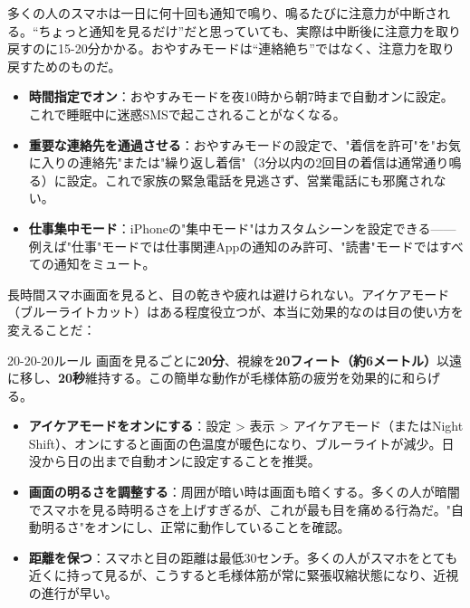 
多くの人のスマホは一日に何十回も通知で鳴り、鳴るたびに注意力が中断される。“ちょっと通知を見るだけ”だと思っていても、実際は中断後に注意力を取り戻すのに15-20分かかる。おやすみモードは“連絡絶ち”ではなく、注意力を取り戻すためのものだ。

\begin{itemize}
  \item \textbf{時間指定でオン}：おやすみモードを夜10時から朝7時まで自動オンに設定。これで睡眠中に迷惑SMSで起こされることがなくなる。
  \item \textbf{重要な連絡先を通過させる}：おやすみモードの設定で、"着信を許可"を"お気に入りの連絡先"または"繰り返し着信"（3分以内の2回目の着信は通常通り鳴る）に設定。これで家族の緊急電話を見逃さず、営業電話にも邪魔されない。
  \item \textbf{仕事集中モード}：iPhoneの"集中モード"はカスタムシーンを設定できる——例えば"仕事"モードでは仕事関連Appの通知のみ許可、"読書"モードではすべての通知をミュート。
\end{itemize}


長時間スマホ画面を見ると、目の乾きや疲れは避けられない。アイケアモード（ブルーライトカット）はある程度役立つが、本当に効果的なのは目の使い方を変えることだ：

\begin{tcbinfo}{20-20-20ルール}
画面を見るごとに\textbf{20分}、視線を\textbf{20フィート（約6メートル）}以遠に移し、\textbf{20秒}維持する。この簡単な動作が毛様体筋の疲労を効果的に和らげる。

\end{tcbinfo}

\begin{itemize}
  \item \textbf{アイケアモードをオンにする}：設定 > 表示 > アイケアモード（またはNight Shift）、オンにすると画面の色温度が暖色になり、ブルーライトが減少。日没から日の出まで自動オンに設定することを推奨。
  \item \textbf{画面の明るさを調整する}：周囲が暗い時は画面も暗くする。多くの人が暗闇でスマホを見る時明るさを上げすぎるが、これが最も目を痛める行為だ。"自動明るさ"をオンにし、正常に動作していることを確認。
  \item \textbf{距離を保つ}：スマホと目の距離は最低30センチ。多くの人がスマホをとても近くに持って見るが、こうすると毛様体筋が常に緊張収縮状態になり、近視の進行が早い。
\end{itemize}

